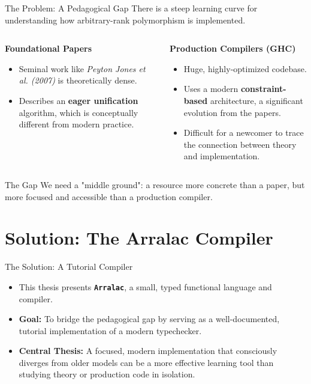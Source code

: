 \documentclass[serif, aspectratio=169]{beamer}
\begin{document}
\begin{frame}{The Problem: A Pedagogical Gap}
  There is a steep learning curve for understanding how arbitrary-rank polymorphism is implemented.
  \begin{columns}[T]
    \begin{column}{0.45\textwidth}
      \textbf{Foundational Papers}
      \begin{itemize}
        \item Seminal work like \textit{Peyton Jones et al. (2007)} is theoretically dense.
        \item Describes an \textbf{eager unification} algorithm, which is conceptually different from modern practice.
      \end{itemize}
    \end{column}
    \begin{column}{0.55\textwidth}
      \textbf{Production Compilers (GHC)}
      \begin{itemize}
        \item Huge, highly-optimized codebase.
        \item Uses a modern \textbf{constraint-based} architecture, a significant evolution from the papers.
        \item Difficult for a newcomer to trace the connection between theory and implementation.
      \end{itemize}
    \end{column}
  \end{columns}
  \vspace{1em}
  \begin{alertblock}{The Gap}
    We need a "middle ground": a resource more concrete than a paper, but more focused and accessible than a production compiler.
  \end{alertblock}
\end{frame}

\section{Solution: The Arralac Compiler}

\begin{frame}{The Solution: A Tutorial Compiler}
  \begin{itemize}
    \item<1-> This thesis presents \textbf{\texttt{Arralac}}, a small, typed functional language and compiler.
    \item<2-> \textbf{Goal:} To bridge the pedagogical gap by serving as a well-documented, tutorial implementation of a modern typechecker.
    \item<3-> \textbf{Central Thesis:} A focused, modern implementation that consciously diverges from older models can be a more effective learning tool than studying theory or production code in isolation.
  \end{itemize}
\end{frame}
\end{document}

